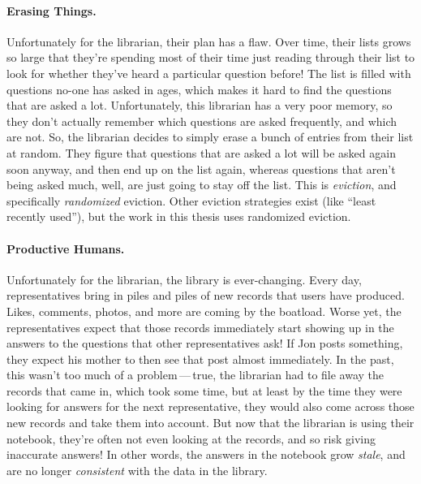 \paragraph{Erasing Things.}
%
Unfortunately for the librarian, their plan has a flaw. Over time, their lists
grows so large that they're spending most of their time just reading through
their list to look for whether they've heard a particular question before! The
list is filled with questions no-one has asked in ages, which makes it hard to
find the questions that are asked a lot. Unfortunately, this librarian has a
very poor memory, so they don't actually remember which questions are asked
frequently, and which are not. So, the librarian decides to simply erase a bunch
of entries from their list at random. They figure that questions that are asked
a lot will be asked again soon anyway, and then end up on the list again,
whereas questions that aren't being asked much, well, are just going to stay off
the list. This is \textit{eviction}, and specifically \textit{randomized}
eviction. Other eviction strategies exist (like ``least recently used''), but
the work in this thesis uses randomized eviction.

\paragraph{Productive Humans.}
%
Unfortunately for the librarian, the library is ever-changing. Every day,
representatives bring in piles and piles of new records that users have
produced. Likes, comments, photos, and more are coming by the boatload. Worse
yet, the representatives expect that those records immediately start showing up
in the answers to the questions that other representatives ask! If Jon posts
something, they expect his mother to then see that post almost immediately. In
the past, this wasn't too much of a problem\,---\,true, the librarian had to
file away the records that came in, which took some time, but at least by the
time they were looking for answers for the next representative, they would also
come across those new records and take them into account. But now that the
librarian is using their notebook, they're often not even looking at the
records, and so risk giving inaccurate answers! In other words, the answers in
the notebook grow \textit{stale}, and are no longer \textit{consistent} with the
data in the library.


